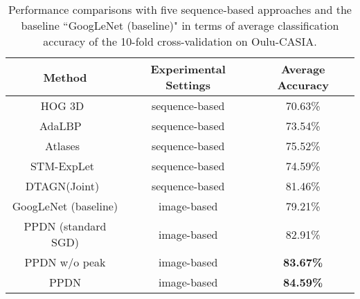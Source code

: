 \documentclass[runningheads]{llncs}
\begin{document}
\begin{table}[!tp]
	\begin{center}
		\caption{Performance comparisons with five sequence-based approaches and the baseline ``GoogLeNet (baseline)" in terms of average classification accuracy of the 10-fold cross-validation  on Oulu-CASIA.}
		\label{table:oulu_sequence}
		\begin{tabular}{c|c|c}
			\hline\noalign{\smallskip}
			Method & Experimental Settings & Average Accuracy\\
			\hline
			HOG 3D~\cite{klaser2008spatio} & sequence-based & 70.63\%\\
			AdaLBP ~\cite{zhao2011facial}& sequence-based & 73.54\%\\
			Atlases~\cite{guo2012dynamic} & sequence-based & 75.52\%\\
			STM-ExpLet~\cite{liu2014learning}& sequence-based & 74.59\%\\
			DTAGN(Joint)~\cite{jung2015joint} & sequence-based & 81.46\%\\
			GoogLeNet (baseline) & image-based & 79.21\%\\
			PPDN (standard SGD) & image-based & 82.91\%\\
			\hline
			PPDN w/o peak  & image-based & \textbf{83.67\%}\\
			PPDN  & image-based & \textbf{84.59\%}\\
			\hline
		\end{tabular}
	\end{center}
\end{table}
\end{document}
